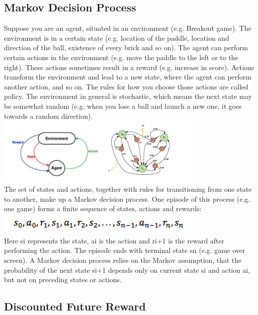 \documentclass[twoside,letterpaper]{article}
\begin{document}
\subsection[Markov Decision Process]{\rmfamily\bfseries\color{black}
Markov Decision Process}
{\color{black}
Suppose you are an agent, situated in an environment (e.g. Breakout game). The environment is in a certain state (e.g. location of the paddle, location and direction of the ball, existence of every brick and so on). The agent can perform certain actions in the environment (e.g. move the paddle to the left or to the right). These actions sometimes result in a reward (e.g. increase in score). Actions transform the environment and lead to a new state, where the agent can perform another action, and so on. The rules for how you choose those actions are called policy. The environment in general is stochastic, which means the next state may be somewhat random (e.g. when you lose a ball and launch a new one, it goes towards a random direction).\\

\centering
\includegraphics[width=10cm]{images/mdp.png}\\
The set of states and actions, together with rules for transitioning from one state to another, make up a Markov decision process. One episode of this process (e.g. one game) forms a finite sequence of states, actions and rewards:\\
\centering
\includegraphics[width=10cm]{images/mdp2.png}\\
Here si represents the state, ai is the action and ri+1 is the reward after performing the action. The episode ends with terminal state sn (e.g. game over screen). A Markov decision process relies on the Markov assumption, that the probability of the next state si+1 depends only on current state si and action ai, but not on preceding states or actions.
}

\subsection[Discounted Future Reward]{\rmfamily\bfseries\color{black}
Discounted Future Reward}
\end{document}
